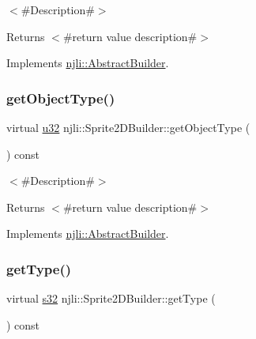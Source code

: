 $<$\#\+Description\#$>$

\begin{DoxyReturn}{Returns}
$<$\#return value description\#$>$ 
\end{DoxyReturn}


Implements \mbox{\hyperlink{classnjli_1_1_abstract_builder_a902f73ea78031b06aca183a417f3413b}{njli\+::\+Abstract\+Builder}}.

\mbox{\label{classnjli_1_1_sprite2_d_builder_a5d998e1a0923159ff1545adffcbe9a60}} 
\subsubsection{\texorpdfstring{get\+Object\+Type()}{getObjectType()}}
{\footnotesize\ttfamily virtual \mbox{\hyperlink{_util_8h_a10e94b422ef0c20dcdec20d31a1f5049}{u32}} njli\+::\+Sprite2\+D\+Builder\+::get\+Object\+Type (\begin{DoxyParamCaption}{ }\end{DoxyParamCaption}) const\hspace{0.3cm}{\ttfamily [virtual]}}

$<$\#\+Description\#$>$

\begin{DoxyReturn}{Returns}
$<$\#return value description\#$>$ 
\end{DoxyReturn}


Implements \mbox{\hyperlink{classnjli_1_1_abstract_builder_a0f2d344fcf697b167f4f2b1122b5fb33}{njli\+::\+Abstract\+Builder}}.

\mbox{\label{classnjli_1_1_sprite2_d_builder_a708d8ea5fa85721c46de45ca9a5f9c54}} 
\subsubsection{\texorpdfstring{get\+Type()}{getType()}}
{\footnotesize\ttfamily virtual \mbox{\hyperlink{_util_8h_aa62c75d314a0d1f37f79c4b73b2292e2}{s32}} njli\+::\+Sprite2\+D\+Builder\+::get\+Type (\begin{DoxyParamCaption}{ }\end{DoxyParamCaption}) const\hspace{0.3cm}{\ttfamily [virtual]}}

